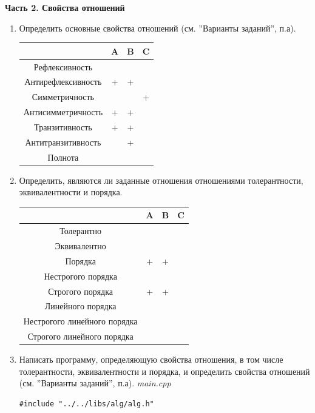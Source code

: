 \documentclass[a4paper,14pt]{extarticle}
\begin{document}
\begin{center} \textbf{Часть 2. Свойства отношений} \end{center}
\begin{enumerate}[label=2.\arabic*.]
	\item Определить основные свойства отношений (см. ”Варианты заданий”, п.а).\\
	      \begin{tabular}{|c|c|c|c|}
		      \hline
		                         & A & B & C \\
		      \hline
		      Рефлексивность     &   &   &   \\
		      \hline
		      Антирефлексивность & + & + &   \\
		      \hline
		      Симметричность     &   &   & + \\
		      \hline
		      Антисимметричность & + & + &   \\
		      \hline
		      Транзитивность     & + & + &   \\
		      \hline
		      Антитранзитивность &   & + &   \\
		      \hline
		      Полнота            &   &   &   \\
		      \hline
	      \end{tabular}
	\item Определить, являются ли заданные отношения отношениями толерантности, эквивалентности и порядка.\\
	      \begin{tabular}{|c|c|c|c|}
		      \hline
		                                   & A & B & C \\
		      \hline
		      Толерантно                   &   &   &   \\
		      \hline
		      Эквивалентно                 &   &   &   \\
		      \hline
		      Порядка                      & + & + &   \\
		      \hline
		      Нестрогого порядка           &   &   &   \\
		      \hline
		      Строгого порядка             & + & + &   \\
		      \hline
		      Линейного порядка            &   &   &   \\
		      \hline
		      Нестрогого линейного порядка &   &   &   \\
		      \hline
		      Строгого линейного порядка   &   &   &   \\

		      \hline
	      \end{tabular}
	\item Написать программу, определяющую свойства отношения, в том числе толерантности, эквивалентности и порядка, и определить свойства отношений (см. ”Варианты заданий”, п.а).
	      \textit{main.cpp}
	      \begin{verbatim}
#include "../../libs/alg/alg.h"


\end{verbatim}
\end{enumerate}
\end{document}
